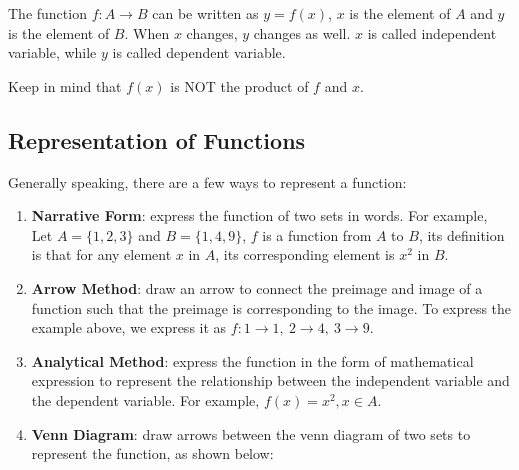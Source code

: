 \documentclass{report}
\begin{document}
\begin{multicols}{2}
  The function $f: A \to B$ can be written as $y = f(x)$, $x$ is the element of
  $A$ and $y$ is the element of $B$. When $x$ changes, $y$ changes as well. $x$
  is called independent variable, while $y$ is called dependent variable.

  Keep in mind that $f(x)$ is NOT the product of $f$ and $x$.

  \subsection*{Representation of Functions}

  Generally speaking, there are a few ways to represent a function:
  \begin{enumerate}
    \item \textbf{Narrative Form}: express the function of two sets in words. For example, Let $A = \big\{1, 2, 3\big\}$ and $B = \big\{1, 4, 9\big\}$, $f$ is a function from $A$ to $B$, its definition is that for any element $x$ in $A$, its corresponding element is $x^2$ in $B$.
    \item \textbf{Arrow Method}: draw an arrow to connect the preimage and image of a function such that the preimage is corresponding to the image. To express the example above, we express it as $f: 1 \to 1,\ 2 \to 4,\ 3 \to 9$.
    \item \textbf{Analytical Method}: express the function in the form of mathematical expression to represent the relationship between the independent variable and the dependent variable. For example, $f(x) = x^2, x \in A$.
    \item \textbf{Venn Diagram}: draw arrows between the venn diagram of two sets to represent the function, as shown below:
          \begin{center}
\end{center}
\end{enumerate}
\end{multicols}
\end{document}

